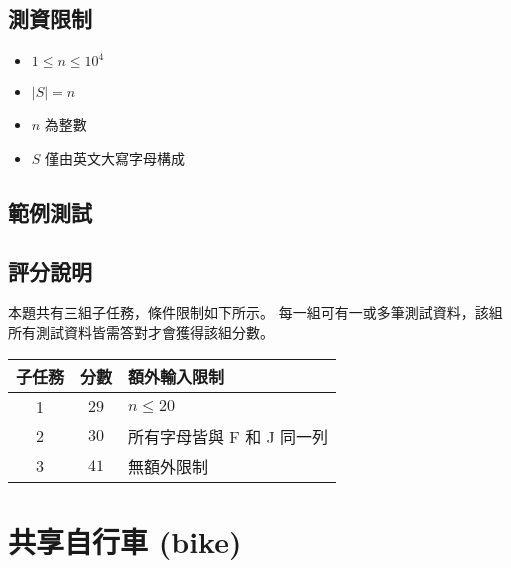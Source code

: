 \subsection{測資限制}

\begin{itemize}
\tightlist
\item
  \begin{math}1 \le n \le 10^4\end{math}
\item
  \begin{math}|S|=n\end{math}
\item
  \begin{math}n\end{math} 為整數
\item
  \begin{math}S\end{math} 僅由英文大寫字母構成
\end{itemize}

\subsection{範例測試}

\begin{example}
%
%
%
\end{example}

\subsection{評分說明}

本題共有三組子任務，條件限制如下所示。
每一組可有一或多筆測試資料，該組所有測試資料皆需答對才會獲得該組分數。

\begin{longtable}[]{@{}ccl@{}}
\toprule
子任務 & 分數 & 額外輸入限制 \\
\midrule
\endhead
1 & \(29\) & \begin{math}n\le20\end{math} \\
2 & \(30\) & 所有字母皆與 F 和 J 同一列 \\
3 & \(41\) & 無額外限制 \\
\bottomrule
\end{longtable}

\section{共享自行車 (bike)}

